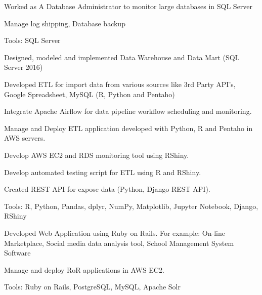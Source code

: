 \documentclass[letterpaper]{deedy-resume} %
\begin{document}
\begin{minipage}[t]{0.66\textwidth}
\begin{tightitemize}
\item Worked as A Database Administrator to monitor large databases in SQL Server
\item Manage log shipping, Database backup
\item Tools: SQL Server

\end{tightitemize}

\sectionspace %


\begin{tightitemize}
\item Designed, modeled and implemented Data Warehouse and Data Mart (SQL
Server 2016)
\item Developed ETL for import data from various sources like 3rd Party API’s,
Google Spreadsheet, MySQL (R, Python and Pentaho)
\item Integrate Apache Airflow for data pipeline workflow scheduling and monitoring.
\item Manage and Deploy ETL application developed with Python, R and Pentaho in
AWS servers.
\item Develop AWS EC2 and RDS monitoring tool using RShiny.
\item Develop automated testing script for ETL using R and RShiny.
\item Created REST API for expose data (Python, Django REST API).
\item Tools: R, Python, Pandas, dplyr, NumPy, Matplotlib, Jupyter Notebook, Django,
RShiny
\end{tightitemize}

\sectionspace %



\begin{tightitemize}
\item Developed Web Application using Ruby on Rails. For example: On-line
Marketplace, Social media data analysis tool, School Management System
Software
\item Manage and deploy RoR applications in AWS EC2.
\item Tools: Ruby on Rails, PostgreSQL, MySQL, Apache Solr
\end{tightitemize}

\sectionspace %

\end{minipage} %
\end{document}
